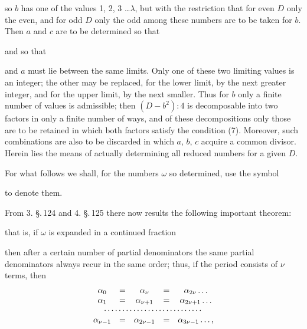 
so $b$ has one of the values 1, 2, 3 \ldots $\lambda$, but with the restriction that for even $D$ only the even, and for odd $D$ only the odd among these numbers are to be taken for $b$. Then $a$ and $c$ are to be determined so that


and so that


and $a$ must lie between the same limits. Only one of these two limiting values is an integer; the other may be replaced, for the lower limit, by the next greater integer, and for the upper limit, by the next smaller. Thus for $b$ only a finite number of values is admissible; then $(D-b^2):4$ is decomposable into two factors in only a finite number of ways, and of these decompositions only those are to be retained in which both factors satisfy the condition (7). Moreover, such combinations are also to be discarded in which $a$, $b$, $c$ acquire a common divisor. Herein lies the means of actually determining all reduced numbers for a given $D$.

For what follows we shall, for the numbers $\omega$ so determined, use the symbol


to denote them.

From 3. \S.\,124 and 4. \S.\,125 there now results the following important theorem:


that is, if $\omega$ is expanded in a continued fraction


then after a certain number of partial denominators the same partial denominators always recur in the same order; thus, if the period consists of $\nu$ terms, then
\[
\begin{array}{ccccc}
\alpha_0 &=& \alpha_\nu &=& \alpha_{2\nu} \ldots\\
\alpha_1 &=& \alpha_{\nu+1} &=& \alpha_{2\nu+1} \ldots\\
\multicolumn{5}{c}{\cdots\cdots\cdots\cdots\cdots\cdots\cdots\cdots\cdots}\\
\alpha_{\nu-1} &=& \alpha_{2\nu-1} &=& \alpha_{3\nu-1} \ldots,
\end{array}
\]

